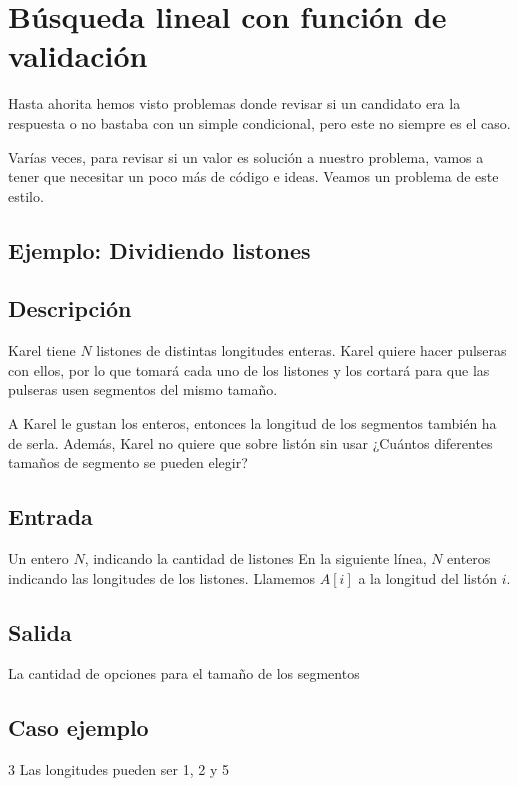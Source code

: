 \section{Búsqueda lineal con función de validación}

Hasta ahorita hemos visto problemas donde revisar si un candidato era la respuesta o no bastaba con un simple condicional, pero este no siempre es el caso.

Varías veces, para revisar si un valor es solución a nuestro problema, vamos a tener que necesitar un poco más de código e ideas. Veamos un problema de este estilo.

\subsection{Ejemplo: Dividiendo listones}


\subsection*{Descripción}
Karel tiene \(N\) listones de distintas longitudes enteras. Karel quiere hacer pulseras con ellos, por lo que tomará cada uno de los listones y los cortará para que las pulseras usen segmentos del mismo tamaño.

A Karel le gustan los enteros, entonces la longitud de los segmentos también ha de serla. Además, Karel no quiere que sobre listón sin usar ¿Cuántos diferentes tamaños de segmento se pueden elegir?

\subsection*{Entrada}
Un entero \(N\), indicando la cantidad de listones
En la siguiente línea, \(N\) enteros indicando las longitudes de los listones. Llamemos \(A[i]\) a la longitud del listón \(i\).

\subsection*{Salida}
La cantidad de opciones para el tamaño de los segmentos

\subsection*{Caso ejemplo}
\begin{casebox3}
	{3}
	{Las longitudes pueden ser 1, 2 y 5}
\end{casebox3}	
